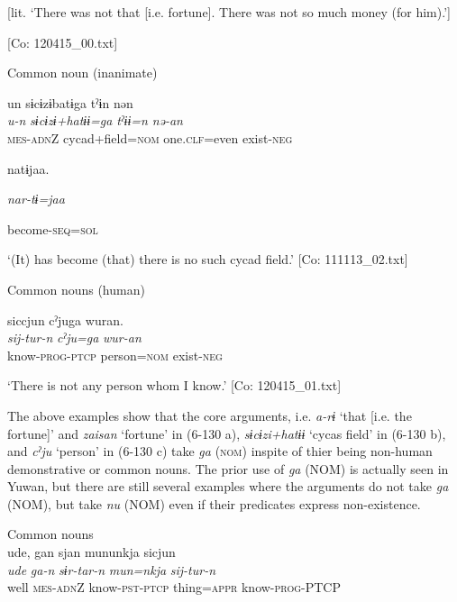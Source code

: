[lit. ‘There was not that [i.e. fortune]. There was not so much money (for him).’]

      [Co: 120415\_00.txt]
\z

  Common noun (inanimate)

 \ex {\TM}  un  sɨcɨzɨbatɨga  tˀɨn  nən\\
\gll \textit{u-n}  \textit{sɨcɨzɨ+hatɨɨ=ga}  \textit{tˀɨɨ=n}  \textit{nə-an}\\

      \textsc{mes}-\textsc{adn}Z  cycad+field=\textsc{nom}  one.\textsc{clf}=even  exist-\textsc{neg}

      natɨjaa.

      \textit{nar-tɨ=jaa}

      become-\textsc{seq}=\textsc{sol}

\glt ‘(It) has become (that) there is no such cycad field.’ [Co: 111113\_02.txt]
\z

  Common nouns (human)

 \ex {\TM}  siccjun  cˀjuga  wuran.\\
\gll \textit{sij-tur-n}  \textit{cˀju=ga}  \textit{wur-an}\\

      know-\textsc{prog}-\textsc{ptcp}  person=\textsc{nom}  exist-\textsc{neg}

\glt ‘There is not any person whom I know.’ [Co: 120415\_01.txt]
\z

The above examples show that the core arguments, i.e. \textit{a-rɨ} ‘that [i.e. the fortune]’ and \textit{zaisan} ‘fortune’ in (6-130 a), \textit{sɨcɨzi+hatɨɨ} ‘cycas field’ in (6-130 b), and \textit{cˀju} ‘person’ in (6-130 c) take \textit{ga} (\textsc{nom}) inspite of thier being non-human demonstrative or common nouns. The prior use of \textit{ga} (NOM) is actually seen in Yuwan, but there are still several examples where the arguments do not take \textit{ga} (NOM), but take \textit{nu} (NOM) even if their predicates express non-existence.

\ea\label{ex:6-131}
 Common nouns\\

 \ea {\TM}  ude,  gan  sjan  mununkja  sicjun\\
\gll \textit{ude}  \textit{ga-n}  \textit{sɨr-tar-n}  \textit{mun=nkja}  \textit{sij-tur-n}\\

      well  \textsc{mes}-\textsc{adn}Z  know-\textsc{pst}-\textsc{ptcp}  thing=\textsc{appr}  know-\textsc{prog}-PTCP

